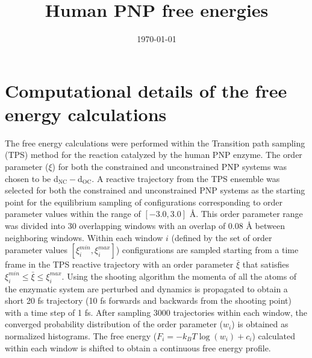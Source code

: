 \documentclass[notitlepage,preprint,%
amssymb,amsmath,
 aip,jcp%
]{revtex4-1}
\begin{document}
\title{Human PNP free energies}
\author{}
%
\date{\today}
\maketitle


\section{Computational details of the free energy calculations}
The free energy calculations were performed within the Transition path sampling 
(TPS) method \cite{Balasubramani22JPhysChemB126p5413} for the reaction catalyzed 
by the human PNP enzyme. The order parameter ($\xi$) for both the constrained
and unconstrained PNP systems was chosen to be d$_{\text{NC}}-$d$_{\text{OC}}$.   
A reactive trajectory from the TPS ensemble was selected for both the constrained 
and unconstrained PNP systems as the starting point for the equilibrium sampling 
of configurations corresponding to order parameter values within the range of 
$\left[-3.0,3.0\right]$ {\AA}. This order parameter range was divided into 30 
overlapping windows with an overlap of 0.08 {\AA} between neighboring windows. 
Within each window $i$ (defined by the set of order parameter values 
$\left[\xi^{min}_i,\xi^{max}_i\right]$) configurations are sampled starting 
from a time frame in the TPS reactive trajectory with an order parameter $\bar{\xi}$
that satisfies $\xi^{min}_i\le \bar{\xi} \le \xi^{max}_{i}$. Using the shooting 
algorithm \cite{Bolhuis02AnnRevPhysChem53p291,dellago02AdvChemPhys123} the momenta 
of all the atoms of the enzymatic system are perturbed and dynamics is propagated 
to obtain a short 20 fs trajectory (10 fs forwards and backwards from the 
shooting point) with a time step of 1 fs. After sampling 3000 trajectories 
within each window, the converged probability distribution
of the order parameter ($w_i$) is obtained as normalized histograms. 
The free energy ($F_i = -k_BT\log(w_i) + c_i$) calculated within each window 
is shifted to obtain a continuous free energy profile.
\end{document}
